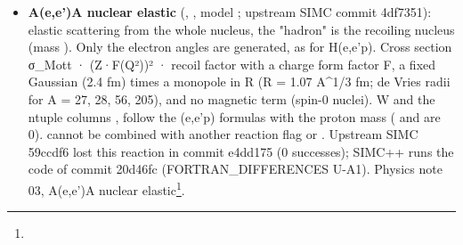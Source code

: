 \begin{itemize}
\begin{itemize}
\item \textbf{theory files} (default): , , ,  in the data directory's
, chosen from A (2, 12, 56, 197). Any other A uses the C-12 file, with a WARNING;
\item \textbf{Benhar spectral functions} ():  (A = 3, 4, 12, 56, 64, 197; Cu-64 since upstream
SIMC a85dc6b), weighted by \hyperref[param:transparency]{}.
\end{itemize}
In a JSON input,  chooses the file explicitly ( sets its directory).  limits the generated
missing energy. Physics note 02, D(e,e'p) and A(e,e'p)\footnote{}.
\item \textbf{A(e,e')A nuclear elastic} (, , model ; upstream SIMC commit
4df7351): elastic scattering from the whole nucleus, the "hadron" is the recoiling nucleus (mass \hyperref[param:targu25massu5famu]{}).
Only the electron angles are generated, as for H(e,e'p). Cross section σ\_Mott · (Z·F(Q²))² · recoil factor with a
charge form factor F, a fixed Gaussian (2.4 fm) times a monopole in R (R = 1.07 A\textasciicircum{}1/\allowbreak{}3 fm; de Vries radii for A = 27, 28, 56, 205), and no magnetic term (spin-0
nuclei). W and the ntuple columns ,  follow the (e,e'p) formulas with the proton mass (
and  are 0). \hyperref[param:doingu5fnucu5felast]{} cannot be combined with another  reaction flag or \hyperref[param:doingu5fphsp]{}.
Upstream SIMC 59ccdf6 lost this reaction in commit e4dd175 (0 successes); SIMC++ runs the code of commit 20d46fc
(FORTRAN\_\allowbreak{}DIFFERENCES U-A1). Physics note 03, A(e,e')A nuclear elastic\footnote{}.
\end{itemize}
